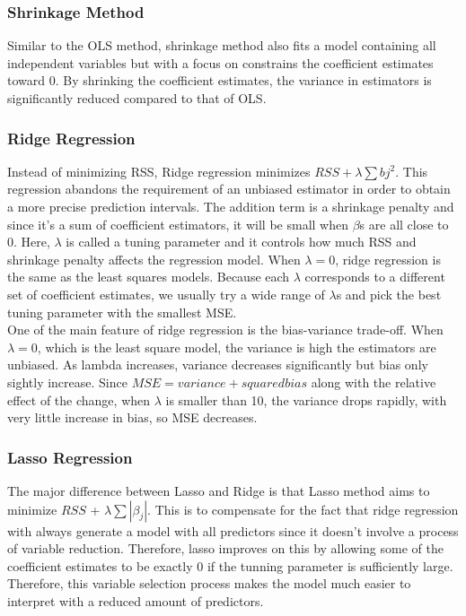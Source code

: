 \documentclass{article}
\begin{document}
\subsubsection{Shrinkage Method}

Similar to the OLS method, shrinkage method also fits a model containing all independent variables but with a focus on constrains the coefficient estimates toward 0. By shrinking the coefficient estimates, the variance in estimators is significantly reduced compared to that of OLS. 

\subsubsection{Ridge Regression }

Instead of minimizing RSS, Ridge regression minimizes $RSS + \lambda \sum bj^2$. This regression abandons the requirement of an unbiased estimator in order to obtain a more precise prediction intervals. The addition term is a shrinkage penalty and since it's a sum of coefficient estimators, it will be small when $\beta$s are all close to 0. Here, $\lambda$ is called a tuning parameter and it controls how much RSS and shrinkage penalty affects the regression model. When $\lambda = 0$, ridge regression is the same as the least squares models. Because each $\lambda$ corresponds to a different set of coefficient estimates, we usually try a wide range of $\lambda$s and pick the best tuning parameter with the smallest MSE. \\

One of the main feature of ridge regression is the bias-variance trade-off. When $\lambda = 0$, which is the least square model, the variance is high the estimators are unbiased. As lambda increases, variance decreases significantly but bias only sightly increase. Since $MSE = variance + squared bias$ along with the relative effect of the change, when $\lambda$ is smaller than 10, the variance drops rapidly, with very little increase in bias, so MSE decreases. 

\subsubsection{Lasso Regression}

The major difference between Lasso and Ridge is that Lasso method aims to minimize $RSS$ + $\lambda \sum |{\beta_j}|$. This is to compensate for the fact that ridge regression with always generate a model with all predictors since it doesn't involve a process of variable reduction. Therefore, lasso improves on this by allowing some of the coefficient estimates to be exactly 0 if the tunning parameter is sufficiently large. Therefore, this variable selection process makes the model much easier to interpret with a reduced amount of predictors. 
\end{document}
